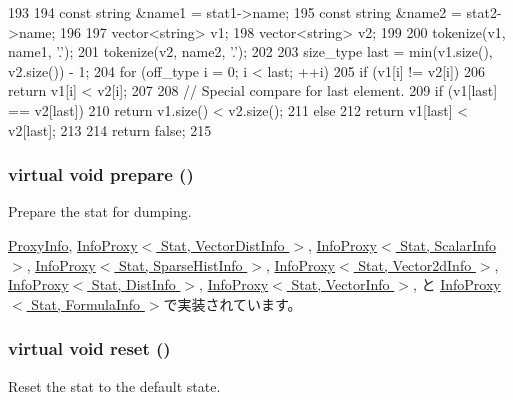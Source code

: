\begin{DoxyCode}
193 {
194     const string &name1 = stat1->name;
195     const string &name2 = stat2->name;
196 
197     vector<string> v1;
198     vector<string> v2;
199 
200     tokenize(v1, name1, '.');
201     tokenize(v2, name2, '.');
202 
203     size_type last = min(v1.size(), v2.size()) - 1;
204     for (off_type i = 0; i < last; ++i)
205         if (v1[i] != v2[i])
206             return v1[i] < v2[i];
207 
208     // Special compare for last element.
209     if (v1[last] == v2[last])
210         return v1.size() < v2.size();
211     else
212         return v1[last] < v2[last];
213 
214     return false;
215 }
\end{DoxyCode}
\hypertarget{classStats_1_1Info_a6516a60ee54e48d9e1f5565c0b8fda5a}{
\subsubsection[{prepare}]{\setlength{\rightskip}{0pt plus 5cm}virtual void prepare ()}}
\label{classStats_1_1Info_a6516a60ee54e48d9e1f5565c0b8fda5a}
Prepare the stat for dumping. 

\hyperlink{classStats_1_1ProxyInfo_a1825b40ca3bc3a1ba67fdb58fac5015c}{ProxyInfo}, \hyperlink{classStats_1_1InfoProxy_a1825b40ca3bc3a1ba67fdb58fac5015c}{InfoProxy$<$ Stat, VectorDistInfo $>$}, \hyperlink{classStats_1_1InfoProxy_a1825b40ca3bc3a1ba67fdb58fac5015c}{InfoProxy$<$ Stat, ScalarInfo $>$}, \hyperlink{classStats_1_1InfoProxy_a1825b40ca3bc3a1ba67fdb58fac5015c}{InfoProxy$<$ Stat, SparseHistInfo $>$}, \hyperlink{classStats_1_1InfoProxy_a1825b40ca3bc3a1ba67fdb58fac5015c}{InfoProxy$<$ Stat, Vector2dInfo $>$}, \hyperlink{classStats_1_1InfoProxy_a1825b40ca3bc3a1ba67fdb58fac5015c}{InfoProxy$<$ Stat, DistInfo $>$}, \hyperlink{classStats_1_1InfoProxy_a1825b40ca3bc3a1ba67fdb58fac5015c}{InfoProxy$<$ Stat, VectorInfo $>$}, と \hyperlink{classStats_1_1InfoProxy_a1825b40ca3bc3a1ba67fdb58fac5015c}{InfoProxy$<$ Stat, FormulaInfo $>$}で実装されています。\hypertarget{classStats_1_1Info_a20dcbdfbd0ec77afc802522bb7e379c1}{
\subsubsection[{reset}]{\setlength{\rightskip}{0pt plus 5cm}virtual void reset ()}}
\label{classStats_1_1Info_a20dcbdfbd0ec77afc802522bb7e379c1}
Reset the stat to the default state. 

